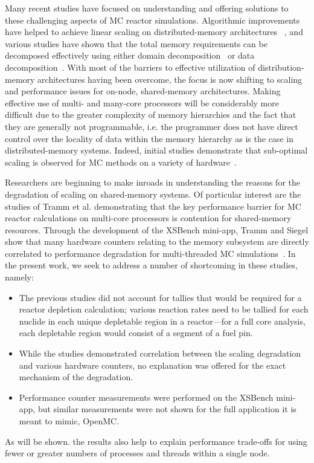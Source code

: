 \documentclass{mc2015}
\begin{document}
Many recent studies have focused on understanding and offering solutions to
these challenging aspects of MC reactor simulations. Algorithmic improvements
have helped to achieve linear scaling on distributed-memory
architectures~\cite{nse-romano-2012, ane-romano-2013} , and various studies have
shown that the total memory requirements can be decomposed effectively using
either domain decomposition~\cite{jcp-siegel-2012, jcp-siegel-2013,
  physor-horelik-2014, pc-horelik-2014} or data
decomposition~\cite{jcp-romano-2013}. With most of the barriers to effective
utilization of distribution-memory architectures having been overcome, the focus
is now shifting to scaling and performance issues for on-node, shared-memory
architectures. Making effective use of multi- and many-core processors will be
considerably more difficult due to the greater complexity of memory hierarchies
and the fact that they are generally not programmable, i.e. the programmer does
not have direct control over the locality of data within the memory hierarchy
as is the case in distributed-memory systems. Indeed, initial studies
demonstrate that sub-optimal scaling is observed for MC methods on a variety
of hardware~\cite{ijhpca-siegel-2014}.

Researchers are beginning to make inroads in understanding the reasons for the
degradation of scaling on shared-memory systems. Of particular interest are the
studies of Tramm et al. demonstrating that the key performance barrier for MC
reactor calculations on multi-core processors is contention for shared-memory
resources. Through the development of the XSBench mini-app, Tramm and
Siegel show that many hardware counters relating to the memory subsystem are
directly correlated to performance degradation for multi-threaded MC
simulations~\cite{physor-tramm-2014, ane-tramm-2014}. In the present work, we
seek to address a number of shortcoming in these studies, namely:
\begin{itemize}
\item The previous studies did not account for tallies that would be required
  for a reactor depletion calculation; various reaction rates need to be
  tallied for each nuclide in each unique depletable region in a reactor---for a
full core analysis, each depletable region would consist of a segment of a fuel pin.
\item While the studies demonstrated correlation between the scaling
  degradation and various hardware counters, no explanation was offered for
  the exact mechanism of the degradation.
\item Performance counter measurements were performed on the XSBench mini-app,
  but similar measurements were not shown for the full application it is meant
  to mimic, OpenMC.
\end{itemize}
As will be shown. the results also help to explain performance trade-offs for
using fewer or greater numbers of processes and threads within a single node.
\end{document}

